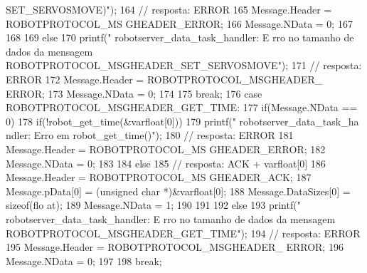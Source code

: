 \begin{DoxyCode}
{{{{{{      SET_SERVOSMOVE)"); 
164                                                 // resposta: ERROR
165                                                 Message.Header = ROBOTPROTOCOL_MS
      GHEADER_ERROR;
166                                                 Message.NData = 0;
167                                         }
168                                 }
169                                 else{
170                                         printf(" robotserver_data_task_handler: E
      rro no tamanho de dados da mensagem ROBOTPROTOCOL_MSGHEADER_SET_SERVOSMOVE"); 
171                                         // resposta: ERROR
172                                         Message.Header = ROBOTPROTOCOL_MSGHEADER_
      ERROR;
173                                         Message.NData = 0;
174                                 }
175                                 break;
176                         case ROBOTPROTOCOL_MSGHEADER_GET_TIME:
177                                 if(Message.NData == 0){
178                                         if(!robot_get_time(&varfloat[0])){
179                                                 printf(" robotserver_data_task_ha
      ndler: Erro em robot_get_time()"); 
180                                                 // resposta: ERROR
181                                                 Message.Header = ROBOTPROTOCOL_MS
      GHEADER_ERROR;
182                                                 Message.NData = 0;
183                                         } 
184                                         else{
185                                                 // resposta: ACK + varfloat[0]
186                                                 Message.Header = ROBOTPROTOCOL_MS
      GHEADER_ACK;
187                                                 Message.pData[0] = (unsigned char
       *)&varfloat[0];
188                                                 Message.DataSizes[0] = sizeof(flo
      at);
189                                                 Message.NData = 1;
190                                         }
191                                 }
192                                 else{
193                                         printf(" robotserver_data_task_handler: E
      rro no tamanho de dados da mensagem ROBOTPROTOCOL_MSGHEADER_GET_TIME"); 
194                                         // resposta: ERROR
195                                         Message.Header = ROBOTPROTOCOL_MSGHEADER_
      ERROR;
196                                         Message.NData = 0;
197                                 }
198                                 break;
}}}}
\end{DoxyCode}
